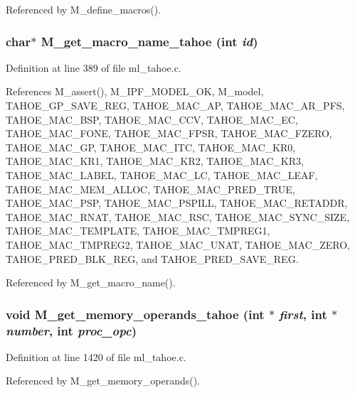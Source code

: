 Referenced by M\_\-define\_\-macros().
\subsubsection{\setlength{\rightskip}{0pt plus 5cm}char$\ast$ M\_\-get\_\-macro\_\-name\_\-tahoe (int {\em id})}\label{ml__tahoe_8c_dd830cd2d2e6ec0c5631555281f98c1e}




Definition at line 389 of file ml\_\-tahoe.c.

References M\_\-assert(), M\_\-IPF\_\-MODEL\_\-OK, M\_\-model, TAHOE\_\-GP\_\-SAVE\_\-REG, TAHOE\_\-MAC\_\-AP, TAHOE\_\-MAC\_\-AR\_\-PFS, TAHOE\_\-MAC\_\-BSP, TAHOE\_\-MAC\_\-CCV, TAHOE\_\-MAC\_\-EC, TAHOE\_\-MAC\_\-FONE, TAHOE\_\-MAC\_\-FPSR, TAHOE\_\-MAC\_\-FZERO, TAHOE\_\-MAC\_\-GP, TAHOE\_\-MAC\_\-ITC, TAHOE\_\-MAC\_\-KR0, TAHOE\_\-MAC\_\-KR1, TAHOE\_\-MAC\_\-KR2, TAHOE\_\-MAC\_\-KR3, TAHOE\_\-MAC\_\-LABEL, TAHOE\_\-MAC\_\-LC, TAHOE\_\-MAC\_\-LEAF, TAHOE\_\-MAC\_\-MEM\_\-ALLOC, TAHOE\_\-MAC\_\-PRED\_\-TRUE, TAHOE\_\-MAC\_\-PSP, TAHOE\_\-MAC\_\-PSPILL, TAHOE\_\-MAC\_\-RETADDR, TAHOE\_\-MAC\_\-RNAT, TAHOE\_\-MAC\_\-RSC, TAHOE\_\-MAC\_\-SYNC\_\-SIZE, TAHOE\_\-MAC\_\-TEMPLATE, TAHOE\_\-MAC\_\-TMPREG1, TAHOE\_\-MAC\_\-TMPREG2, TAHOE\_\-MAC\_\-UNAT, TAHOE\_\-MAC\_\-ZERO, TAHOE\_\-PRED\_\-BLK\_\-REG, and TAHOE\_\-PRED\_\-SAVE\_\-REG.

Referenced by M\_\-get\_\-macro\_\-name().
\subsubsection{\setlength{\rightskip}{0pt plus 5cm}void M\_\-get\_\-memory\_\-operands\_\-tahoe (int $\ast$ {\em first}, int $\ast$ {\em number}, int {\em proc\_\-opc})}\label{ml__tahoe_8c_a388057865d300904a57adab6cb5b0d0}




Definition at line 1420 of file ml\_\-tahoe.c.

Referenced by M\_\-get\_\-memory\_\-operands().
